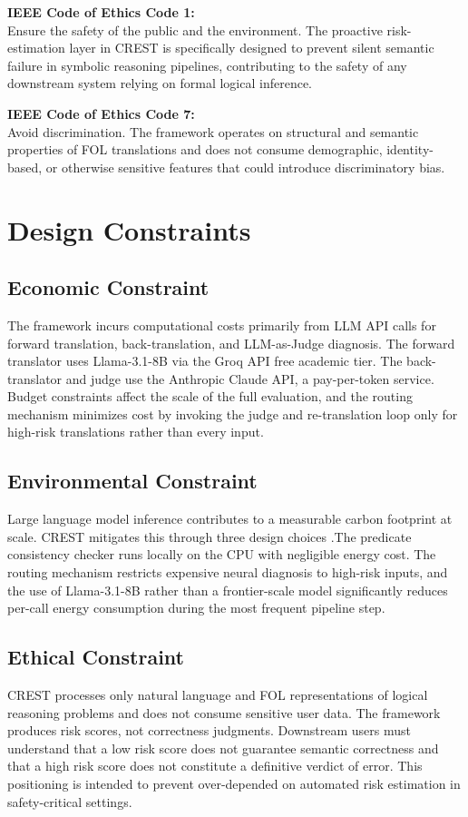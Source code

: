 \textbf{IEEE Code of Ethics Code 1:}\\
Ensure the safety of the public and the environment. The proactive risk-estimation layer in CREST is specifically designed to prevent silent semantic failure in symbolic reasoning pipelines, contributing to the safety of any downstream system relying on formal logical inference.

\textbf{IEEE Code of Ethics Code 7:}\\
Avoid discrimination. The framework operates on structural and semantic properties of FOL translations and does not consume demographic, identity-based, or otherwise sensitive features that could introduce discriminatory bias.

\section{Design Constraints}

\subsection{Economic Constraint}
The framework incurs computational costs primarily from LLM API calls for forward translation, back-translation, and LLM-as-Judge diagnosis. The forward translator uses Llama-3.1-8B via the Groq API free academic tier. The back-translator and judge use the Anthropic Claude API, a pay-per-token service. Budget constraints affect the scale of the full evaluation, and the routing mechanism minimizes cost by invoking the judge and re-translation loop only for high-risk translations rather than every input.

\subsection{Environmental Constraint}
Large language model inference contributes to a measurable carbon footprint at scale. CREST mitigates this through three design choices .The predicate consistency checker runs locally on the CPU with negligible energy cost. The routing mechanism restricts expensive neural diagnosis to high-risk inputs, and the use of Llama-3.1-8B rather than a frontier-scale model significantly reduces per-call energy consumption during the most frequent pipeline step.

\subsection{Ethical Constraint}
CREST processes only natural language and FOL representations of logical reasoning problems and does not consume sensitive user data. The framework produces risk scores, not correctness judgments. Downstream users must understand that a low risk score does not guarantee semantic correctness and that a high risk score does not constitute a definitive verdict of error. This positioning is intended to prevent over-depended on automated risk estimation in safety-critical settings.

